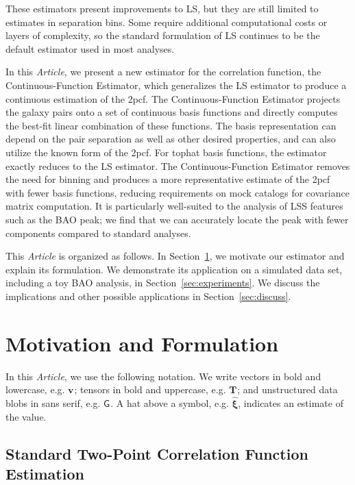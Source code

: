 \documentclass[modern]{aastex62}
\newcommand{\cf}{2pcf\xspace} %
\newcommand{\Est}{The Continuous-Function Estimator\xspace}
\newcommand{\est}{the Continuous-Function Estimator\xspace}
\newcommand{\documentname}{\textsl{Article}\xspace}
\newcommand{\LS}{LS\xspace}
\newcommand{\bld}[1]{\bm{#1}} %
\newcommand{\vv}[1]{\bld{v}_\mathrm{#1}}
\newcommand{\TT}[1]{\bld{T}_\mathrm{#1}}
\newcommand{\GG}[1]{\mathsf{G}_{#1}}
\begin{document}
These estimators present improvements to \LS, but they are still limited to estimates in separation bins.
Some require additional computational costs or layers of complexity, so the standard formulation of \LS continues to be the default estimator used in most analyses.

In this \documentname, we present a new estimator for the correlation function, \est, which generalizes the \LS estimator to produce a continuous estimation of the \cf. 
\Est projects the galaxy pairs onto a set of continuous basis functions and directly computes the best-fit linear combination of these functions.
The basis representation can depend on the pair separation as well as other desired properties, and can also utilize the known form of the \cf.
For tophat basis functions, the estimator exactly reduces to the \LS estimator. 
\Est removes the need for binning and produces a more representative estimate of the \cf with fewer basis functions, reducing requirements on mock catalogs for covariance matrix computation.
It is particularly well-suited to the analysis of LSS features such as the BAO peak; we find that we can accurately locate the peak with fewer components compared to standard analyses.

This \documentname is organized as follows. 
In Section~\ref{sec:motiv}, we motivate our estimator and explain its formulation.
We demonstrate its application on a simulated data set, including a toy BAO analysis, in Section~\ref{sec:experiments}.
We discuss the implications and other possible applications in Section~\ref{sec:discuss}. 

\section{Motivation and Formulation} 
\label{sec:motiv}

In this \documentname, we use the following notation.
We write vectors in bold and lowercase, e.g. $\vv{}$; tensors in bold and uppercase, e.g. $\TT{}$; and unstructured data blobs in sans serif, e.g. $\GG{}$.
A hat above a symbol, e.g. $\bld{\hat{\xi}}$, indicates an estimate of the value.

\subsection{Standard Two-Point Correlation Function Estimation}
\end{document}
